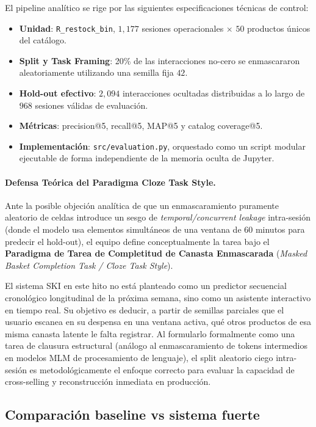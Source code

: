 \documentclass[12pt,a4paper]{article}
\newcommand{\code}[1]{\texttt{\small #1}}
\begin{document}
El pipeline analítico se rige por las siguientes especificaciones técnicas de control:

\begin{itemize}
    \item \textbf{Unidad}: \code{R\_restock\_bin}, $1{,}177$ sesiones operacionales $\times$ $50$ productos únicos del catálogo.
    \item \textbf{Split y Task Framing}: 20\% de las interacciones no-cero se enmascararon aleatoriamente utilizando una semilla fija $42$. 
    \item \textbf{Hold-out efectivo}: $2{,}094$ interacciones ocultadas distribuidas a lo largo de $968$ sesiones válidas de evaluación.
    \item \textbf{Métricas}: precision@5, recall@5, MAP@5 y catalog coverage@5.
    \item \textbf{Implementación}: \code{src/evaluation.py}, orquestado como un script modular ejecutable de forma independiente de la memoria oculta de Jupyter.
\end{itemize}

\paragraph{Defensa Teórica del Paradigma Cloze Task Style.} Ante la posible objeción analítica de que un enmascaramiento puramente aleatorio de celdas introduce un sesgo de \textit{temporal/concurrent leakage} intra-sesión (donde el modelo usa elementos simultáneos de una ventana de 60 minutos para predecir el hold-out), el equipo define conceptualmente la tarea bajo el \textbf{Paradigma de Tarea de Completitud de Canasta Enmascarada} (\textit{Masked Basket Completion Task / Cloze Task Style}). 

El sistema SKI en este hito no está planteado como un predictor secuencial cronológico longitudinal de la próxima semana, sino como un asistente interactivo en tiempo real. Su objetivo es deducir, a partir de semillas parciales que el usuario escanea en su despensa en una ventana activa, qué otros productos de esa misma canasta latente le falta registrar. Al formularlo formalmente como una tarea de clausura estructural (análogo al enmascaramiento de tokens intermedios en modelos MLM de procesamiento de lenguaje), el split aleatorio ciego intra-sesión es metodológicamente el enfoque correcto para evaluar la capacidad de cross-selling y reconstrucción inmediata en producción.

\subsection{Comparación baseline vs sistema fuerte}
\end{document}

